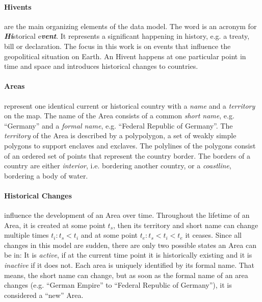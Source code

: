 \paragraph{Hivents} %
\label{par:hivent}

are the main organizing elements of the data model. The word is an acronym for \emph{\textbf{Hi}}storical e\emph{\textbf{vent}}. It represents a significant happening in history, e.g. a treaty, bill or declaration. The focus in this work is on events that influence the geopolitical situation on Earth. An Hivent happens at one particular point in time and space and introduces historical changes to countries.


\vspace{-1em}
\paragraph{Areas} %
\label{par:area}

represent one identical current or historical country with a \emph{name} and a \emph{territory} on the map. The name of the Area consists of a common \emph{short name}, e.g. ``Germany'' and a \emph{formal name}, e.g. ``Federal Republic of Germany''. The \emph{territory} of the Area is described by a polypolygon, a set of weakly simple polygons to support enclaves and exclaves. The polylines of the polygons consist of an ordered set of points that represent the country border. The borders of a country are either \emph{interior}, i.e. bordering another country, or a \emph{coastline}, bordering a body of water.


\vspace{-1em}
\paragraph{Historical Changes} %
\label{par:historical_changes}

influence the development of an Area over time. Throughout the lifetime of an Area, it is created at some point $t_s$, then its territory and short name can change multiple times $t_i: t_s < t_i$ and at some point $t_e: t_s < t_i < t_e$ it ceases. Since all changes in this model are sudden, there are only two possible states an Area can be in: It is \emph{active}, if at the current time point it is historically existing and it is \emph{inactive} if it does not. Each area is uniquely identified by its formal name. That means, the short name can change, but as soon as the formal name of an area changes (e.g. ``German Empire'' to ``Federal Republic of Germany''), it is considered a ``new'' Area.

